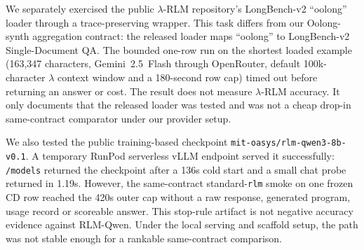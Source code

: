 \documentclass[letterpaper]{article}
\begin{document}
We separately exercised the public $\lambda$-RLM repository's LongBench-v2 ``oolong'' loader through a trace-preserving wrapper. This task differs from our Oolong-synth aggregation contract: the released loader maps ``oolong'' to LongBench-v2 Single-Document QA. The bounded one-row run on the shortest loaded example (163{,}347 characters, Gemini~2.5~Flash through OpenRouter, default 100k-character $\lambda$ context window and a 180-second row cap) timed out before returning an answer or cost. The result does not measure $\lambda$-RLM accuracy. It only documents that the released loader was tested and was not a cheap drop-in same-contract comparator under our provider setup.

We also tested the public training-based checkpoint \texttt{mit-oasys/rlm-qwen3-8b-v0.1}. A temporary RunPod serverless vLLM endpoint served it successfully: \texttt{/models} returned the checkpoint after a 136s cold start and a small chat probe returned in 1.19s. However, the same-contract standard-\texttt{rlm} smoke on one frozen CD row reached the 420s outer cap without a raw response, generated program, usage record or scoreable answer. This stop-rule artifact is not negative accuracy evidence against RLM-Qwen. Under the local serving and scaffold setup, the path was not stable enough for a rankable same-contract comparison.
\end{document}
